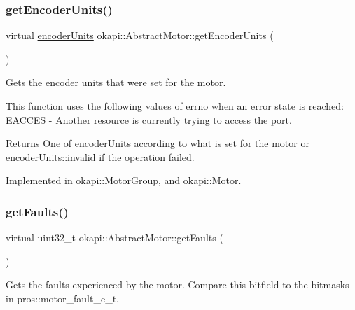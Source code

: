 \subsubsection{\texorpdfstring{getEncoderUnits()}{getEncoderUnits()}}
{\footnotesize\ttfamily virtual \mbox{\hyperlink{classokapi_1_1AbstractMotor_ae811cd825099f2defadeb1b7f7e7764c}{encoder\+Units}} okapi\+::\+Abstract\+Motor\+::get\+Encoder\+Units (\begin{DoxyParamCaption}{ }\end{DoxyParamCaption})\hspace{0.3cm}{\ttfamily [pure virtual]}}

Gets the encoder units that were set for the motor.

This function uses the following values of errno when an error state is reached\+: E\+A\+C\+C\+ES -\/ Another resource is currently trying to access the port.

\begin{DoxyReturn}{Returns}
One of encoder\+Units according to what is set for the motor or \mbox{\hyperlink{classokapi_1_1AbstractMotor_ae811cd825099f2defadeb1b7f7e7764cafedb2d84cafe20862cb4399751a8a7e3}{encoder\+Units\+::invalid}} if the operation failed. 
\end{DoxyReturn}


Implemented in \mbox{\hyperlink{classokapi_1_1MotorGroup_a1bc6347732e108a171b6e9a846722817}{okapi\+::\+Motor\+Group}}, and \mbox{\hyperlink{classokapi_1_1Motor_afcc6183588ce056927878dfc479e6fee}{okapi\+::\+Motor}}.

\mbox{\label{classokapi_1_1AbstractMotor_ae741463ec8de88c4f7ba854b5d6d7bce}} 
\subsubsection{\texorpdfstring{getFaults()}{getFaults()}}
{\footnotesize\ttfamily virtual uint32\+\_\+t okapi\+::\+Abstract\+Motor\+::get\+Faults (\begin{DoxyParamCaption}{ }\end{DoxyParamCaption})\hspace{0.3cm}{\ttfamily [pure virtual]}}

Gets the faults experienced by the motor. Compare this bitfield to the bitmasks in pros\+::motor\+\_\+fault\+\_\+e\+\_\+t.

